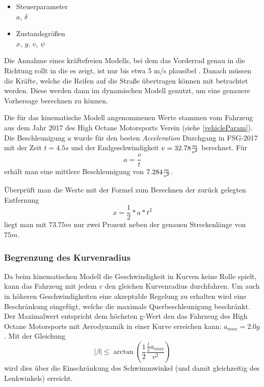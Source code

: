 \documentclass{like}
\begin{document}
\begin{itemize}
	\item Steuerparameter  \\
	\(a\), \(\delta\)
	\item Zustandsgrößen \\
	\(x\), \(y\), \(v\), \(\psi\)
	
\end{itemize}


Die Annahme eines kräftefreien Modells, bei dem das Vorderrad genau in die Richtung rollt in die es zeigt, ist nur bis etwa 5 m/s plausibel \cite{rajamani2011vehicle}. Danach müssen die Kräfte, welche die Reifen auf die Straße übertragen können mit betrachtet werden. Diese werden dann im dynamischen Modell genutzt, um eine genauere Vorhersage berechnen zu können.

Die für das kinematische Modell angenommenen Werte stammen vom Fahrzeug aus dem Jahr 2017 des High Octane Motorsports Verein (siehe \ref{vehicleParam}). Die Beschleunigung \(a\) wurde für den besten \textit{Acceleration} Durchgang in FSG-2017 mit der Zeit $t = 4.5s$ und der Endgeschwindigkeit $v = 32.78 \frac{m}{s\textsuperscript{2}}$ berechnet. Für 
\begin{equation}
a = \frac{v}{t}  \label{long_acc_kin}
\end{equation}
erhält man eine mittlere Beschleunigung von $7.284 \frac{m}{s\textsuperscript{2}} $.

Überprüft man die Werte mit der Formel zum Berechnen der zurück gelegten Entfernung 
\begin{equation}
x = \frac{1}{2} * a * t^2  
\end{equation}
liegt man mit \(73.75m\) nur zwei Prozent neben der genauen Streckenlänge von \(75m\).

\subsubsection*{Begrenzung des Kurvenradius}
\label{betaMax}
Da beim kinematischen Modell die Geschwindigkeit in Kurven keine Rolle spielt, kann das Fahrzeug mit jedem \(v\) den gleichen Kurvenradius durchfahren. Um auch in höheren Geschwindigkeiten eine akzeptable Regelung zu erhalten wird eine Beschränkung eingefügt, welche die maximale Querbeschleunigung beschränkt. Der Maximalwert entspricht dem höchsten g-Wert den das Fahrzeug des High Octane Motorsports mit Aerodynamik in einer Kurve erreichen kann: $a_{max} = 2.0g$. 
Mit der Gleichung
\begin{equation}
	|\beta| \leq \arctan(\frac{1}{2} \frac{\frac{l}{2} a_{max}}{v^2})
\end{equation}
wird dies über die Einschränkung des Schwimmwinkel (und damit gleichzeitig des Lenkwinkels) erreicht.
\end{document}
